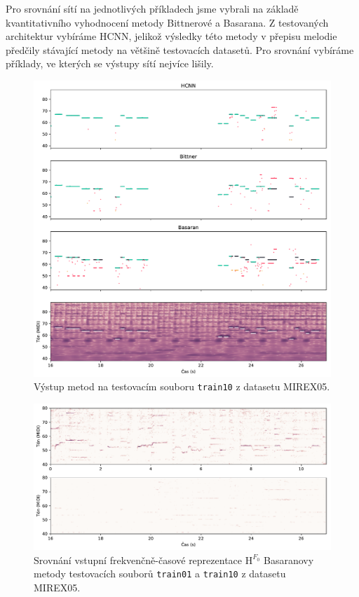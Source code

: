 Pro srovnání sítí na jednotlivých příkladech jsme vybrali na základě kvantitativního vyhodnocení metody Bittnerové a Basarana. Z testovaných architektur vybíráme HCNN, jelikož výsledky této metody v přepisu melodie předčily stávající metody na většině testovacích datasetů. Pro srovnání vybíráme příklady, ve kterých se výstupy sítí nejvíce lišily.

\begin{figure}[h]\centering
\includegraphics[width=\textwidth,height=\textheight,keepaspectratio]{../img/vysledky/mirex05_train10}
\caption{Výstup metod na testovacím souboru \texttt{train10} z datasetu MIREX05.}
\label{obr:mirex05_train10}
\end{figure}

\begin{figure}[h]\centering
\includegraphics[width=\textwidth,height=\textheight,keepaspectratio]{../img/vysledky/basaran_salience_comparison}
\caption{Srovnání vstupní frekvenčně-časové reprezentace $\bm{\mathrm{H}}^{F_0}$ Basaranovy metody testovacích souborů \texttt{train01} a \texttt{train10} z datasetu MIREX05.}
\label{obr:basaran_salience_comparison}
\end{figure}

